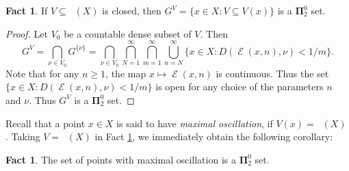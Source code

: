 \documentclass{amsart}
\theoremstyle{definition}
\newtheorem{fact}[thm]{Fact}
\newcommand{\bP}{\boldsymbol{\Pi}}
\newcommand{\bS}{\boldsymbol{\Sigma}}
\DeclareMathOperator{\Emp}{\mathcal{E}}%
\DeclareMathOperator{\M}{\mathcal{M}}
\DeclareMathOperator{\MT}{\mathcal{M}_{\mathit T} }
\newcommand{\weakst}{weak$^*$}
\newcommand{\N}{\mathbb{N}}
\begin{document}
\begin{fact} \label{upper:GW}
If $V\subseteq \MT(X)$ is closed, then
$G^V=\{x\in X\colon  V\subseteq V(x)\}$ is a $\bP^0_2$ set.
\end{fact}


\begin{proof}
Let $V_0$ be a countable dense subset of $V$. Then
\[
G^V = \bigcap_{\nu \in V_0} G^{\{ \nu \} } =
\bigcap_{\nu \in V_0}
\bigcap_{N = 1}^\infty
\bigcap_{m = 1}^\infty
\bigcup_{n = N}^\infty
\{ x \in X \colon D(\Emp(x, n), \nu)  < 1/m \}.
\]
Note that for any $n \geq 1$, the map $x \mapsto \Emp(x, n)$ is continuous. Thus the set $\{ x \in X \colon D(\Emp(x, n), \nu)  < 1/m \}$ is open for any choice of the parameters $n$ and $\nu$. Thus $G^V$ is a $\bP^0_2$ set.
\end{proof}

Recall that a point $x \in X$ is said to have \emph{maximal oscillation}, if $V(x) = \MT(X)$ \cite[Def. 21.17]{DGS}.
Taking $V = \MT(X)$ in Fact \ref{upper:GW}, we immediately obtain the following corollary:

\begin{fact}
The set of points with maximal oscillation is a $\bP^0_2$ set.
\end{fact}


%
%
%
\end{document}
